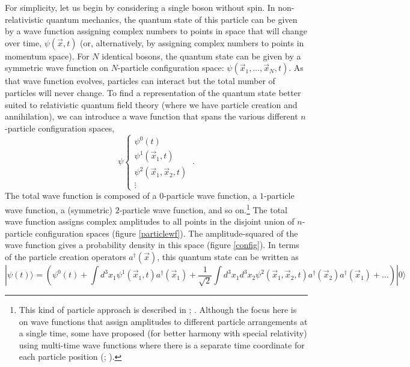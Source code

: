 \documentclass[onecolumn,secnumarabic,amsmath,amssymb,balancelastpage,nofootinbib]{article}
\begin{document}
For simplicity, let us begin by considering a single boson without spin.  In non-relativistic quantum mechanics, the quantum state of this particle can be given by a wave function assigning complex numbers to points in space that will change over time, $\psi(\vec{x}, t)$ (or, alternatively, by assigning complex numbers to points in momentum space).  For $N$ identical bosons, the quantum state can be given by a symmetric wave function on $N$-particle configuration space: $\psi(\vec{x}_1, \dots, \vec{x}_N, t)$.  As that wave function evolves, particles can interact but the total number of particles will never change.  To find a representation of the quantum state better suited to relativistic quantum field theory (where we have particle creation and annihilation), we can introduce a wave function that spans the various different $n$-particle configuration spaces,
\begin{equation}
\psi \left\{ \begin{matrix}
\psi^{0}(t) \\
\psi^{1}(\vec{x}_1,t) \\
\psi^{2}(\vec{x}_1,\vec{x}_2,t) \\
\vdots
\end{matrix}
\right.\ .
\label{totalWFscalar}
\end{equation}
The total wave function is composed of a $0$-particle wave function, a $1$-particle wave function, a (symmetric) $2$-particle wave function, and so on.\footnote{This kind of particle approach is described in \citet[sec.\ 6f, 7c]{schweberQFT}; \citet{dgz2004, durr2005, tumulka2018}.  Although the focus here is on wave functions that assign amplitudes to different particle arrangements at a single time, some have proposed (for better harmony with special relativity) using multi-time wave functions where there is a separate time coordinate for each particle position (\citealp{lienert2017}; \citealp[ch.\ 4]{lienert2020}).}  The total wave function assigns complex amplitudes to all points in the disjoint union of $n$-particle configuration spaces (figure \ref{particlewf}).  The amplitude-squared of the wave function gives a probability density in this space (figure \ref{config}).  In terms of the particle creation operators $a^\dagger (\vec{x})$, this quantum state can be written as
\begin{equation}
| \psi (t) \rangle = \left(\psi^{0}(t) + \int d^3 x_1 \psi^{1}(\vec{x}_1,t) a^\dagger (\vec{x}_1) + \frac{1}{\sqrt{2}}\int d^3 x_1 d^3 x_2 \psi^{2}(\vec{x}_1,\vec{x}_2,t) a^\dagger (\vec{x}_2) a^\dagger (\vec{x}_1)+\dots \right)| 0 \rangle
\label{WFscalar}
\end{equation}
\end{document}
